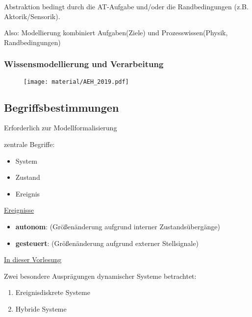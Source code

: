 Abstraktion bedingt durch die AT-Aufgabe und/oder die Randbedingungen (z.B. Aktorik/Sensorik).

Also: Modellierung kombiniert Aufgaben(Ziele) und Prozesswissen(Physik, Randbedingungen)




\subsubsection{Wissensmodellierung und Verarbeitung}
\begin{figure}[H]
	\centering
	\texttt{[image: material/AEH\_2019.pdf]}
\end{figure}


\subsection{Begriffsbestimmungen}
Erforderlich zur Modellformalisierung

zentrale Begriffe:
\begin{itemize}
	\item System 
	\item Zustand
	\item Ereignis 
\end{itemize}






\underline{Ereignisse}
\begin{itemize}
	\item \textbf{autonom}: (Größenänderung aufgrund interner Zustandsübergänge)
	\item \textbf{gesteuert}: (Größenänderung aufgrund externer Stellsignale)
\end{itemize}



\underline{In dieser Vorlesung}

Zwei besondere Ausprägungen dynamischer Systeme betrachtet:
\begin{enumerate}
	\item Ereignisdiskrete Systeme
	\item Hybride Systeme 
\end{enumerate}

